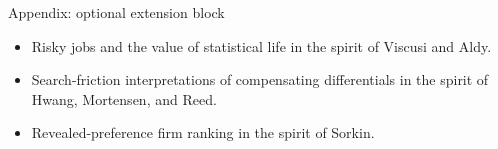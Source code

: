 \documentclass[aspectratio=169,11pt]{beamer}
\begin{document}
\appendix

\begin{frame}{Appendix: optional extension block}
\begin{itemize}
    \item Risky jobs and the value of statistical life in the spirit of Viscusi and Aldy.
    \item Search-friction interpretations of compensating differentials in the spirit of Hwang, Mortensen, and Reed.
    \item Revealed-preference firm ranking in the spirit of Sorkin.
\end{itemize}
\end{frame}
\end{document}
